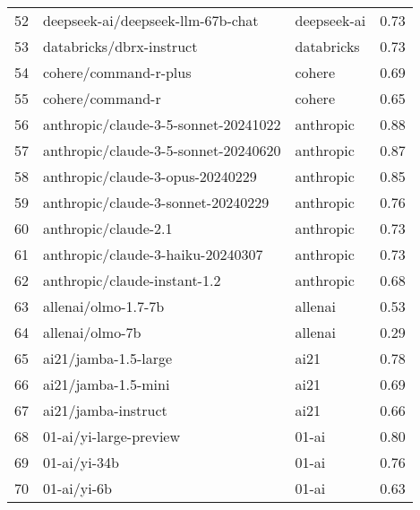\begin{longtable}{lllr}
52 & deepseek-ai/deepseek-llm-67b-chat & deepseek-ai & 0.73 \\
53 & databricks/dbrx-instruct & databricks & 0.73 \\
54 & cohere/command-r-plus & cohere & 0.69 \\
55 & cohere/command-r & cohere & 0.65 \\
56 & anthropic/claude-3-5-sonnet-20241022 & anthropic & 0.88 \\
57 & anthropic/claude-3-5-sonnet-20240620 & anthropic & 0.87 \\
58 & anthropic/claude-3-opus-20240229 & anthropic & 0.85 \\
59 & anthropic/claude-3-sonnet-20240229 & anthropic & 0.76 \\
60 & anthropic/claude-2.1 & anthropic & 0.73 \\
61 & anthropic/claude-3-haiku-20240307 & anthropic & 0.73 \\
62 & anthropic/claude-instant-1.2 & anthropic & 0.68 \\
63 & allenai/olmo-1.7-7b & allenai & 0.53 \\
64 & allenai/olmo-7b & allenai & 0.29 \\
65 & ai21/jamba-1.5-large & ai21 & 0.78 \\
66 & ai21/jamba-1.5-mini & ai21 & 0.69 \\
67 & ai21/jamba-instruct & ai21 & 0.66 \\
68 & 01-ai/yi-large-preview & 01-ai & 0.80 \\
69 & 01-ai/yi-34b & 01-ai & 0.76 \\
70 & 01-ai/yi-6b & 01-ai & 0.63 \\
\end{longtable}
